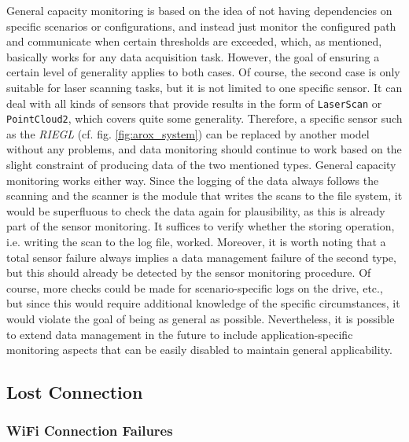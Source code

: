 \documentclass[english, master, utf8]{base/thesis_KBS}
\newcommand{\code}[1]{\colorbox{light-gray}{\texttt{#1}}}
\begin{document}
General capacity monitoring is based on the idea of not having dependencies on specific scenarios or configurations, and instead just monitor the configured path and communicate
when certain thresholds are exceeded, which, as mentioned, basically works for any data acquisition task. However, the goal of ensuring a certain level of generality applies to
both cases. Of course, the second case is only suitable for laser scanning tasks, but it is not limited to one specific sensor. It can deal with all kinds of sensors that provide
results in the form of \code{LaserScan} or \code{PointCloud2}, which covers quite some generality. Therefore, a specific sensor such as the \textit{RIEGL} (cf. fig.
\ref{fig:arox_system}) can be replaced by another model without any problems, and data monitoring should continue to work based on the slight constraint of producing data of the
two mentioned types. General capacity monitoring works either way. Since the logging of the data always follows the scanning and the scanner is the module that writes the scans to
the file system, it would be superfluous to check the data again for plausibility, as this is already part of the sensor monitoring. It suffices to verify whether the storing
operation, i.e. writing the scan to the log file, worked. Moreover, it is worth noting that a total sensor failure always implies a data management failure of the second type,
but this should already be detected by the sensor monitoring procedure. Of course, more checks could be made for scenario-specific logs on the drive, etc., but since this would
require additional knowledge of the specific circumstances, it would violate the goal of being as general as possible. Nevertheless, it is possible to extend data management in
the future to include application-specific monitoring aspects that can be easily disabled to maintain general applicability.

\subsection{Lost Connection}
\label{sec:sim_and_mon_lost_connections}

\subsubsection{WiFi Connection Failures}
\label{sec:sim_and_mon_wifi_connection_problems}
\end{document}
